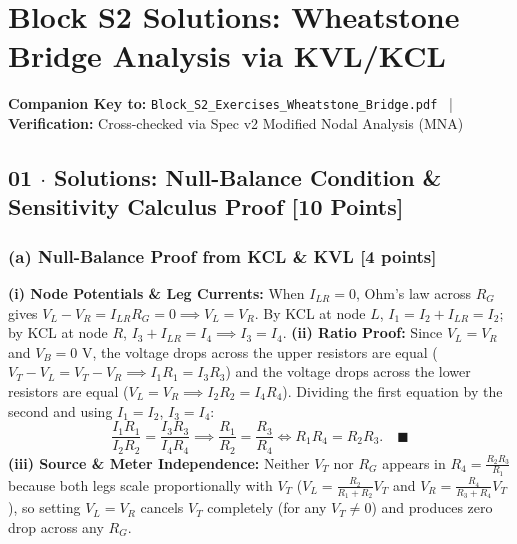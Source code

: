 \documentclass[10pt,letterpaper]{article}
\begin{document}
\section*{Block S2 Solutions: Wheatstone Bridge Analysis via KVL/KCL}

  \textbf{Companion Key to:} \texttt{Block\_S2\_Exercises\_Wheatstone\_Bridge.pdf} ~|~
  \textbf{Verification:} Cross-checked via Spec v2 Modified Nodal Analysis (MNA)


\subsection*{01 $\cdot$ Solutions: Null-Balance Condition \& Sensitivity Calculus Proof \hfill [10 Points]}


  \subsubsection*{(a) Null-Balance Proof from KCL \& KVL [4 points]}
  \textbf{(i) Node Potentials \& Leg Currents:} When $I_{LR} = 0$, Ohm's law across $R_G$ gives $V_L - V_R = I_{LR} R_G = 0 \implies V_L = V_R$. By KCL at node $L$, $I_1 = I_2 + I_{LR} = I_2$; by KCL at node $R$, $I_3 + I_{LR} = I_4 \implies I_3 = I_4$.
  \textbf{(ii) Ratio Proof:} Since $V_L = V_R$ and $V_B = 0\text{ V}$, the voltage drops across the upper resistors are equal ($V_T - V_L = V_T - V_R \implies I_1 R_1 = I_3 R_3$) and the voltage drops across the lower resistors are equal ($V_L = V_R \implies I_2 R_2 = I_4 R_4$). Dividing the first equation by the second and using $I_1 = I_2$, $I_3 = I_4$:
  $$\frac{I_1 R_1}{I_2 R_2} = \frac{I_3 R_3}{I_4 R_4} \implies \frac{R_1}{R_2} = \frac{R_3}{R_4} \Longleftrightarrow R_1 R_4 = R_2 R_3. \quad \blacksquare$$
  \textbf{(iii) Source \& Meter Independence:} Neither $V_T$ nor $R_G$ appears in $R_4 = \frac{R_2 R_3}{R_1}$ because both legs scale proportionally with $V_T$ ($V_L = \frac{R_2}{R_1+R_2}V_T$ and $V_R = \frac{R_4}{R_3+R_4}V_T$), so setting $V_L = V_R$ cancels $V_T$ completely (for any $V_T \neq 0$) and produces zero drop across any $R_G$.
\end{document}
